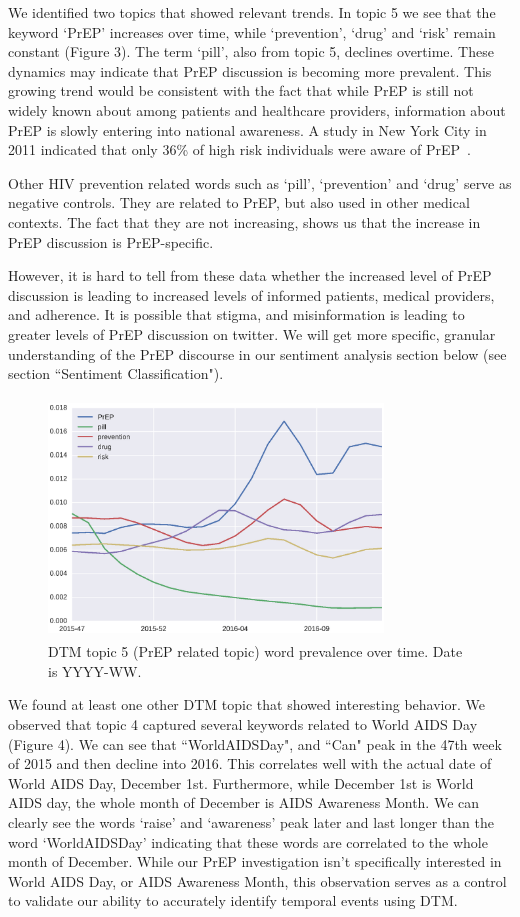\documentclass{sig-alternate-05-2015}
\begin{document}
We identified two topics that showed relevant trends. In topic 5 we see that the keyword `PrEP' increases over time, while `prevention', `drug' and `risk' remain constant (Figure 3). The term `pill', also from topic 5, declines overtime. These dynamics may indicate that PrEP discussion is becoming more prevalent. This growing trend would be consistent with the fact that while PrEP is still not widely known about among patients and healthcare providers, information about PrEP is slowly entering into national awareness. A study in New York City in 2011 indicated that only 36\% of high risk individuals were aware of PrEP~\cite{mehta2011awareness}.

Other HIV prevention related words such as `pill', `prevention' and `drug' serve as negative controls. They are related to PrEP, but also used in other medical contexts. The fact that they are not increasing, shows us that the increase in PrEP discussion is PrEP-specific.

However, it is hard to tell from these data whether the increased level of PrEP discussion is leading to increased levels of informed patients, medical providers, and adherence. It is possible that stigma, and misinformation is leading to greater levels of PrEP discussion on twitter. We will get more specific, granular understanding of the PrEP discourse in our sentiment analysis section below (see section ``Sentiment Classification").

\begin{figure}
\centering
\includegraphics[height=2.5in, width=3.5in]{DTMfig1}
\caption{DTM topic 5 (PrEP related topic) word prevalence over time. Date is YYYY-WW.}
\end{figure}

We found at least one other DTM topic that showed interesting behavior. We observed that topic 4 captured several keywords related to World AIDS Day (Figure 4). We can see that ``WorldAIDSDay", and ``Can" peak in the 47th week of 2015 and then decline into 2016. This correlates well with the actual date of World AIDS Day, December 1st. Furthermore, while December 1st is World AIDS day, the whole month of December is AIDS Awareness Month. We can clearly see the words `raise' and `awareness' peak later and last longer than the word `WorldAIDSDay' indicating that these words are correlated to the whole month of December. While our PrEP investigation isn't specifically interested in World AIDS Day, or AIDS Awareness Month, this observation serves as a control to validate our ability to accurately identify temporal events using DTM. 
\end{document}

